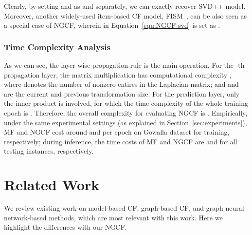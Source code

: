\documentclass[sigconf]{acmart}
\theoremstyle{definition}
\begin{document}
Clearly, by setting  and  as  and  separately, we can exactly recover SVD++ model.
Moreover, another widely-used item-based CF model, FISM~\cite{FISM}, can be also seen as a special case of NGCF, wherein  in Equation~\eqref{equ:NGCF-svd} is set as .












\subsubsection{\textbf{Time Complexity Analysis}}\label{sec:complexity}
As we can see, the layer-wise propagation rule is the main operation.
For the -th propagation layer, the matrix multiplication has computational complexity , where  denotes the number of nonzero entires in the Laplacian matrix; and  and  are the current and previous transformation size.
For the prediction layer, only the inner product is involved, for which the time complexity of the whole training epoch is .
Therefore, the overall complexity for evaluating NGCF is .
Empirically, under the same experimental settings (as explained in Section~\ref{sec:experiments}), MF and NGCF cost around  and  per epoch on Gowalla dataset for training, respectively;
during inference, the time costs of MF and NGCF are  and  for all testing instances, respectively. \section{Related Work}\label{sec:related-work}
We review existing work on model-based CF, graph-based CF, and graph neural network-based methods, which are most relevant with this work.
Here we highlight the differences with our NGCF.
\end{document}
